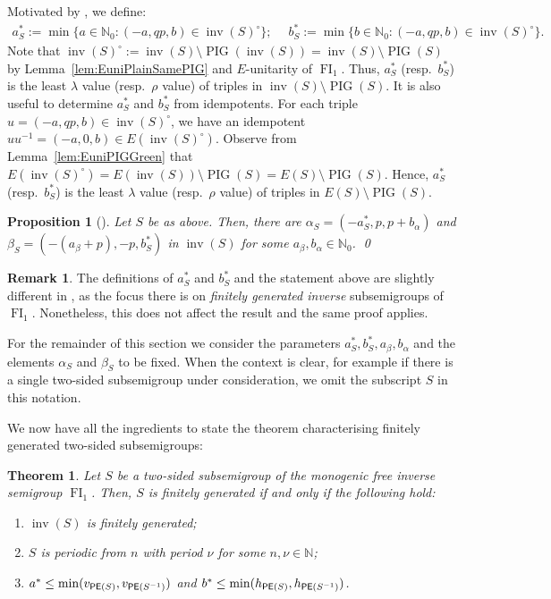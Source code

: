 \documentclass[reqno]{amsart}
\theoremstyle{plain}
\newtheorem{thm}[lem]{Theorem}
\newtheorem{prop}[lem]{Proposition}
\theoremstyle{definition}
\newtheorem{rmk}[lem]{Remark}
\DeclareMathOperator{\inv}{inv}
\DeclareMathOperator{\PIG}{PIG}
\DeclareMathOperator{\FI}{FI}
\DeclareMathOperator{\PE}{\textup{\textsf{PE}}}
\newenvironment{thmenumerate}{\begin{enumerate}[topsep=0mm, leftmargin=14mm,itemsep=1mm,label=\textup{(\roman*)}]
}{\end{enumerate}}
\numberwithin{equation}{section}
\begin{document}
Motivated by \cite{OliveiraSilva}, we define:
\begin{align*}
    a_{S}^\ast := \min\bigl\{a\in\mathbb{N}_0: (-a, qp, b)\in \inv(S)^\circ\bigr\};\quad\;
    b_{S}^\ast := \min\bigl\{b\in\mathbb{N}_0: (-a, qp, b)\in \inv(S)^\circ\bigr\}.
\end{align*}
Note that $\inv(S)^\circ := \inv(S)\setminus\PIG(\inv(S)) = \inv(S)\setminus\PIG(S)$ by Lemma~\ref{lem:EuniPlainSamePIG} and $E$-unitarity of $\FI_1$. Thus, $a_S^\ast$ (resp.\ $b_S^\ast$) is the least $\lambda$ value (resp.\ $\rho$ value) of triples in $\inv(S)\setminus\PIG(S)$. It is also useful to determine $a_S^\ast$ and $b_S^\ast$ from idempotents. For each triple $u=(-a, qp, b)\in \inv(S)^\circ$, we have an idempotent $uu^{-1} = (-a, 0, b)\in E(\inv(S)^\circ)$. Observe from Lemma~\ref{lem:EuniPIGGreen} that $E(\inv(S)^\circ)= E(\inv(S))\setminus\PIG(S) = E(S)\setminus\PIG(S)$. Hence, $a_S^\ast$ (resp.\ $b_S^\ast$) is the least $\lambda$ value (resp.\ $\rho$ value) of triples in $E(S)\setminus\PIG(S)$.


\begin{prop}[{\cite[Lemma 2.2]{OliveiraSilva}}]
\label{prop:OliveiraSilva}
Let $S$ be as above. Then, there are $\alpha_S = (-a_{S}^\ast, p, p+b_\alpha)$ and $\beta_S = (-(a_\beta+p), -p, b_S^\ast)$ in $\inv(S)$ for some $a_\beta, b_\alpha\in\mathbb{N}_0$. \qed
\end{prop}

\begin{rmk}
The definitions of $a_S^\ast$ and $b_S^\ast$ and the statement above are slightly different in \cite{OliveiraSilva}, as the focus there is on \emph{finitely generated inverse} subsemigroups of $\FI_1$. Nonetheless, this does not affect the result and the same proof applies.
\end{rmk}



For the remainder of this section we consider the parameters $a_{S}^\ast, b_S^\ast, a_\beta, b_\alpha$ and the elements $\alpha_S$ and $\beta_S$ to be fixed. When the context is clear, for example if there is a single two-sided subsemigroup under consideration, we omit the subscript $S$ in this notation.


We now have all the ingredients to state the theorem characterising finitely generated two-sided subsemigroups:

\begin{thm}
\label{thm:2side}
Let $S$ be a two-sided subsemigroup of the monogenic free inverse semigroup $\FI_1$. Then, $S$ is finitely generated if and only if the following hold:
\begin{thmenumerate}
    \item \label{it:2side1} $\inv(S)$ is finitely generated;
    \item \label{it:2side2} $S$ is periodic from $n$ with period $\nu$ for some $n,\nu\in\mathbb{N}$;
    \item \label{it:2side3} $a^\ast \leq \min(v_{\PE(S)}, v_{\PE(S^{-1})})$ and $b^\ast \leq \min(h_{\PE(S)}, h_{\PE(S^{-1})})$.
\end{thmenumerate}
\end{thm}
\end{document}
